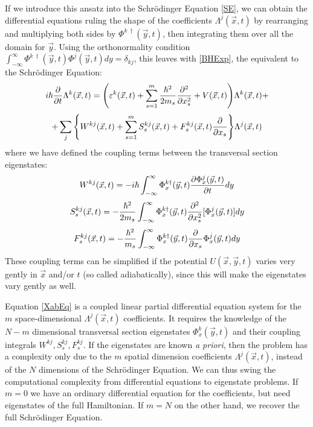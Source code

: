 \documentclass[11pt, a4paper]{article} %
\begin{document}
If we introduce this ansatz into the Schrödinger Equation \eqref{SE}, we can obtain the differential equations ruling the shape of the coefficients $\Lambda^j(\vec{x},t)$ by rearranging and multiplying both sides by $\Phi^{k\ \dagger}(\vec{y},t)$, then integrating them over all the domain for $\vec{y}$. Using the orthonormality condition $\int_{-\infty}^{\infty}\Phi^{k\ \dagger}(\vec{y},t) \Phi^{j}(\vec{y},t) dy= \delta_{kj}$, this leaves with \eqref{BHExp}, the equivalent to the Schrödinger Equation:\vspace{-0.1cm}
\begin{equation}\label{XabEq}
i\hbar \pdv{}{t}\Lambda^k(\vec{x},t) = \qty( \varepsilon^k(\vec{x},t) + \sum_{s=1}^m\frac{\hbar^2}{2m_s}\pdv[2]{}{x_s}+V(\vec{x},t))\Lambda^k(\vec{x},t)+
\end{equation}
$$
 +\sum_j \qty{ W^{kj}(\vec{x},t) + \sum_{s=1}^m S^{kj}_s(\vec{x},t)+F^{kj}_s(\vec{x},t)\pdv{}{x_s} } \Lambda^j(\vec{x},t) 
$$
where we have defined the coupling terms between the transversal section eigenstates:
\begin{equation}
W^{kj}(\vec{x},t) = -i\hbar\int_{-\infty}^{\infty}\Phi_x^{k\dagger}(\vec{y},t) \pdv{\Phi^j_x(\vec{y},t)}{t} dy
\end{equation}
\begin{equation}\label{S}
S^{kj}_s(\vec{x},t) = -\frac{\hbar^2}{2m_s}\int_{-\infty}^{\infty}\Phi_x^{k\dagger}(\vec{y},t) \pdv[2]{}{x_s} [\Phi^j_x(\vec{y},t)] dy
\end{equation}
\begin{equation}\label{F}
F^{kj}_s(\vec{x},t) = -\frac{\hbar^2}{m_s}\int_{-\infty}^{\infty}\Phi_x^{k\dagger}(\vec{y},t) \pdv{}{x_s}\Phi^j_x(\vec{y},t) dy
\end{equation}
These coupling terms can be simplified if the potential $U(\vec{x},\vec{y},t)$ varies very gently in $\vec{x}$ and/or $t$ (so called adiabatically), since this will make the eigenstates vary gently as well.

Equation \eqref{XabEq} is a coupled linear partial differential equation system for the $m$ space-dimensional $\Lambda^j(\vec{x},t)$ coefficients. It requires the knowledge of the $N-m$ dimensional transversal section eigenstates $\Phi^k_x(\vec{y},t)$ and their coupling integrals $W^{kj}, S^{kj}_s, F^{kj}_s$.  If the eigenstates are known {\em a priori}, then the problem has a complexity only due to the $m$ spatial dimension coefficients $\Lambda^j(\vec{x},t)$, instead of the $N$ dimensions of the Schrödinger Equation. We can thus swing the computational complexity from differential equations to eigenstate problems. If $m=0$ we have an ordinary differential equation for the coefficients, but need eigenstates of the full Hamiltonian. If $m=N$ on the other hand, we recover the full Schrödinger Equation.
\vspace{-0.3cm}
\end{document}
